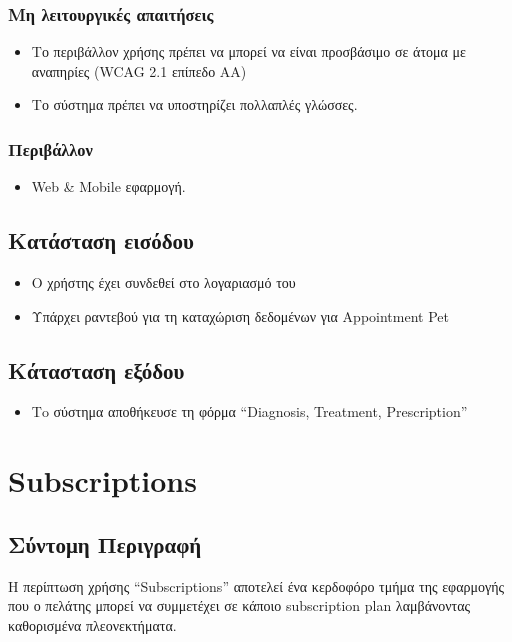 \documentclass[12pt,a4paper,twoside]{book}
\begin{document}
\subsubsection{Μη λειτουργικές απαιτήσεις}
\begin{itemize}
  \item Το περιβάλλον χρήσης πρέπει να μπορεί να  είναι προσβάσιμο σε  άτομα με αναπηρίες (WCAG 2.1 επίπεδο AA) %
  \item Το σύστημα πρέπει να υποστηρίζει πολλαπλές γλώσσες.
\end{itemize}

\subsubsection{Περιβάλλον}
\begin{itemize}
  \item Web \& Mobile εφαρμογή.
\end{itemize}

\subsection{Κατάσταση εισόδου} %
\begin{itemize}
  \item Ο χρήστης έχει συνδεθεί στο λογαριασμό του %
  \item Υπάρχει ραντεβού για τη καταχώριση δεδομένων για Appointment Pet   %
\end{itemize}

\subsection{Κάτασταση εξόδου} %
\begin{itemize}
  \item Τo σύστημα αποθήκευσε τη φόρμα “Diagnosis, Treatment, Prescription”
\end{itemize}

\section{Subscriptions}

\subsection{Σύντομη Περιγραφή}
Η περίπτωση χρήσης “Subscriptions” αποτελεί ένα κερδοφόρο τμήμα της εφαρμογής που ο πελάτης μπορεί να συμμετέχει σε κάποιο subscription plan λαμβάνοντας καθορισμένα πλεονεκτήματα. %
\end{document}
